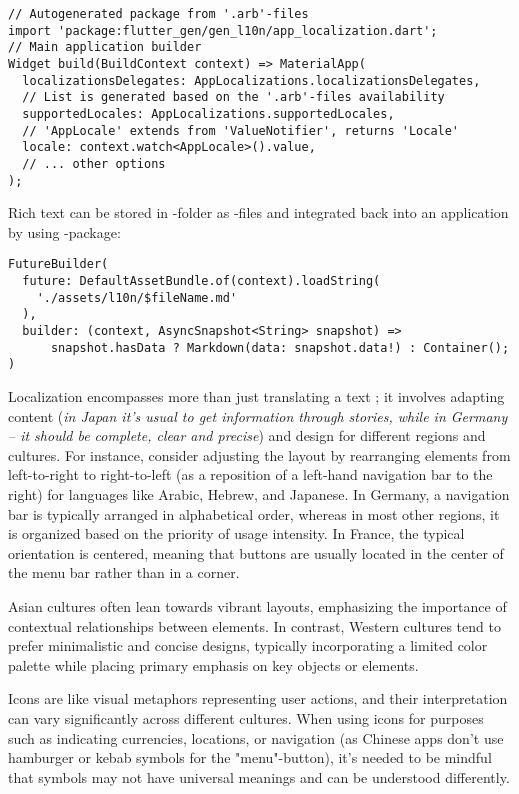 \begin{lstlisting}
// Autogenerated package from '.arb'-files
import 'package:flutter_gen/gen_l10n/app_localization.dart';
// Main application builder
Widget build(BuildContext context) => MaterialApp(
  localizationsDelegates: AppLocalizations.localizationsDelegates,
  // List is generated based on the '.arb'-files availability
  supportedLocales: AppLocalizations.supportedLocales,
  // 'AppLocale' extends from 'ValueNotifier', returns 'Locale'
  locale: context.watch<AppLocale>().value,
  // ... other options
);
\end{lstlisting}

\noindent Rich text can be stored in -folder as -files and integrated back into an application by using 
-package:

\begin{lstlisting}
FutureBuilder(
  future: DefaultAssetBundle.of(context).loadString(
    './assets/l10n/$fileName.md'
  ),
  builder: (context, AsyncSnapshot<String> snapshot) =>
      snapshot.hasData ? Markdown(data: snapshot.data!) : Container();
)
\end{lstlisting}

\noindent Localization encompasses more than just translating a text \cite{Hofs03}; it involves adapting content 
(\emph{in Japan it's usual to get information through stories, while in Germany -- it should be complete, clear and 
precise}) and design for different regions and cultures. For instance, consider adjusting the layout by rearranging 
elements from left-to-right to right-to-left (as a reposition of a left-hand navigation bar to the right) for languages 
like Arabic, Hebrew, and Japanese. In Germany, a navigation bar is typically arranged in alphabetical order, whereas 
in most other regions, it is organized based on the priority of usage intensity. In France, the typical orientation is 
centered, meaning that buttons are usually located in the center of the menu bar rather than in a corner.

Asian cultures often lean towards vibrant layouts, emphasizing the importance of contextual relationships between 
elements. In contrast, Western cultures tend to prefer minimalistic and concise designs, typically incorporating a 
limited color palette while placing primary emphasis on key objects or elements.

Icons are like visual metaphors representing user actions, and their interpretation can vary significantly across 
different cultures. When using icons for purposes such as indicating currencies, locations, or navigation (as Chinese 
apps don't use hamburger or kebab symbols for the "menu"-button), it's needed to be mindful that symbols may not have 
universal meanings and can be understood differently.

